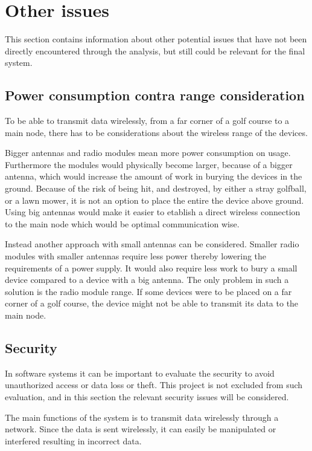 \section{Other issues}
This section contains information about other potential issues that have not been directly encountered through the analysis, but still could be relevant for the final system.

\subsection{Power consumption contra range consideration} 
To be able to transmit data wirelessly, from a far corner of a golf course to a main node, there has to be considerations about the wireless range of the devices.

Bigger antennas and radio modules mean more power consumption on usage. Furthermore the modules would physically become larger, because of a bigger antenna, which would increase the amount of work in burying the devices in the ground. Because of the risk of being hit, and destroyed, by either a stray golfball, or a lawn mower, it is not an option to place the entire the device above ground. Using big antennas would make it easier to etablish a direct wireless connection to the main node which would be optimal communication wise.

Instead another approach with small antennas can be considered. Smaller radio modules with smaller antennas require less power thereby lowering the requirements of a power supply. It would also require less work to bury a small device compared to a device with a big antenna. The only problem in such a solution is the radio module range. If some devices were to be placed on a far corner of a golf course, the device might not be able to transmit its data to the main node. 

\subsection{Security}
In software systems it can be important to evaluate the security to avoid unauthorized access or data loss or theft. This project is not excluded from such evaluation, and in this section the relevant security issues will be considered.

The main functions of the system is to transmit data wirelessly through a network. Since the data is sent wirelessly, it can easily be manipulated or interfered resulting in incorrect data.

